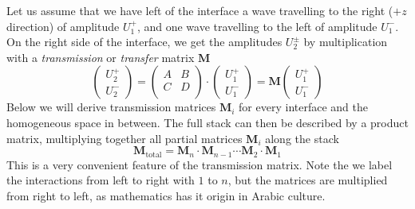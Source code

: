 Let us assume that we have left of the interface a wave travelling to the right ($+z$ direction) of amplitude $U_1^+$, and one wave travelling to the left of amplitude $U_1^-$. On the right side of the interface, we get the amplitudes $U_2^\pm$ by multiplication with a \emph{transmission} or \emph{transfer} matrix $\mathbf{M}$
\begin{equation}
\begin{pmatrix}
U_2^+ \\ U_2^-
\end{pmatrix}
= 
\begin{pmatrix}
A & B \\ C & D \\
\end{pmatrix}
\cdot
\begin{pmatrix}
U_1^+ \\ U_1^-
\end{pmatrix}
%
= \mathbf{M}
\begin{pmatrix}
U_1^+ \\ U_1^-
\end{pmatrix} \label{eq:def_T_matrix}
\end{equation}
Below we will derive transmission matrices $\mathbf{M}_i$ for every interface and the homogeneous space in between. The full stack can then be described by a product matrix, multiplying together all partial matrices $\mathbf{M}_i$ along the stack
\begin{equation}
\mathbf{M}_\text{total} = \mathbf{M}_n \cdot  \mathbf{M}_{n-1} \cdots\mathbf{M}_2 \cdot  \mathbf{M}_{1}
\end{equation}
This is a very convenient feature of the transmission matrix.
Note the we label the interactions from left to right with $1$ to $n$, but the matrices are multiplied from right to left, as mathematics has it origin in Arabic culture.

